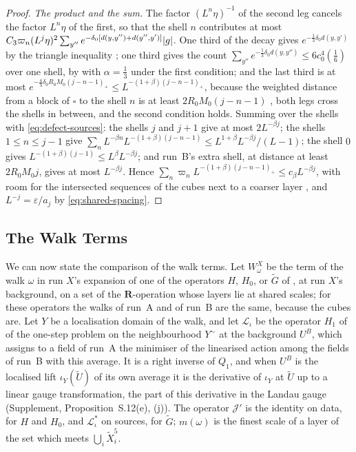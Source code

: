\documentclass[11pt]{preprint}
\DeclarePairedDelimiter{\abs}{\lvert}{\rvert}
\numberwithin{equation}{section}
\theoremstyle{definition}
\theoremstyle{remark}
\theoremstyle{plain}
\begin{document}
\begin{proof}
\emph{The product and the sum.} The factor $(L^n\eta)^{-1}$ of the second leg cancels the factor $L^n\eta$ of the first, so that the shell $n$ contributes at most $C_3\varpi_n(L^j\eta)^2\sum_{y''}e^{-\delta_0[d(y, y'') + d(y'', y')]}\abs{g}$. One third of the decay gives $e^{-\frac13\delta_0d(y, y')}$ by the triangle inequality \cite[(2.54)]{BalabanPRT2}; one third gives the count $\sum_{y''}e^{-\frac13\delta_0d(y, y'')} \leq 6c_0^4(\frac16)$ over one shell, by \cite[(2.58)]{BalabanPRT2} with $\alpha = \frac13$ under the first condition; and the last third is at most $e^{-\frac43\delta_0R_0M_0(j-n-1)_+} \leq L^{-(1+\beta)(j-n-1)_+}$, because the weighted distance from a block of $\square$ to the shell $n$ is at least $2R_0M_0(j - n - 1)$ \cite[(2.60)]{BalabanPRT2}, both legs cross the shells in between, and the second condition holds. Summing over the shells with \eqref{eq:defect-sources}: the shells $j$ and $j + 1$ give at most $2L^{-\beta j}$; the shells $1 \leq n \leq j - 1$ give $\sum_nL^{-\beta n}L^{-(1+\beta)(j-n-1)} \leq L^{1+\beta}L^{-\beta j}/(L - 1)$; the shell $0$ gives $L^{-(1+\beta)(j-1)} \leq L^\beta L^{-\beta j}$; and run~B's extra shell, at distance at least $2R_0M_0j$, gives at most $L^{-\beta j}$. Hence $\sum_n\varpi_nL^{-(1+\beta)(j-n-1)_+} \leq c_\beta L^{-\beta j}$, with room for the intersected sequences of the cubes next to a coarser layer \cite[p.~408]{BalabanPBG}, and $L^{-j} = \varepsilon/a_j$ by \eqref{eq:shared-spacing}.
\end{proof}

\subsection{The Walk Terms}\label{sec:walk-terms}

We can now state the comparison of the walk terms. Let $W^X_\omega$ be the term of the walk $\omega$ in run $X$'s expansion of one of the operators $H$, $H_0$, or $\tilde G$ of \cite[(1.2)--(1.4), p.~2]{BalabanRG2}, at run $X$'s background, on a set of the $\mathbf R$-operation whose layers lie at shared scales; for these operators the walks of run~A and of run~B are the same, because the cubes are. Let $Y$ be a localisation domain of the walk, and let $\mathcal L_\iota$ be the operator $H_1$ of \cite[(3.129), p.~421]{BalabanPBG} of the one-step problem on the neighbourhood $Y^\sim$ at the background $U^B$, which assigns to a field of run~A the minimiser of the linearised action among the fields of run~B with this average. It is a right inverse of $Q_1$, and when $U^B$ is the localised lift $\iota_Y(\tilde U)$ of its own average it is the derivative of $\iota_Y$ at $\tilde U$ up to a linear gauge transformation, the part of this derivative in the Landau gauge (Supplement, Proposition~S.12(e), (j)). The operator $\mathcal J'$ is the identity on data, for $H$ and $H_0$, and $\mathcal L_\iota^*$ on sources, for $\tilde G$; $m(\omega)$ is the finest scale of a layer of the set which meets $\bigcup_i\tilde X_i^5$.
\end{document}

